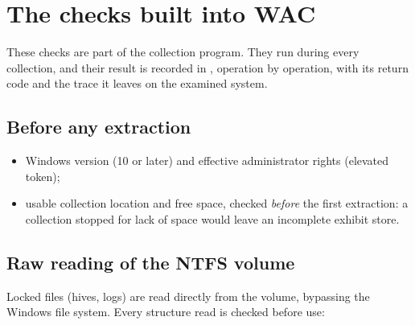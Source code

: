 \documentclass[11pt,a4paper,oneside]{report}
\begin{document}
\chapter{The checks built into WAC}\label{ch:integres}

These checks are part of the collection program. They run during every
collection, and their result is recorded in ,
operation by operation, with its return code and the trace it leaves on the
examined system.

\section{Before any extraction}

\begin{itemize}
  \item Windows version (10 or later) and effective administrator rights
    (elevated token);
  \item usable collection location and free space, checked \emph{before} the
    first extraction: a collection stopped for lack of space would leave an
    incomplete exhibit store.
\end{itemize}

\section{Raw reading of the NTFS volume}

Locked files (hives, logs) are read directly from the volume, bypassing the
Windows file system. Every structure read is checked before use:
\end{document}
